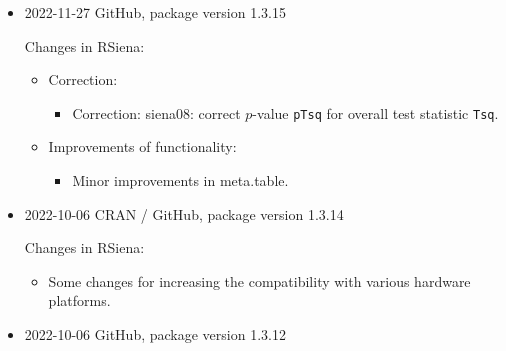 \documentclass[a4paper,fleqn,11pt]{article}
\newcommand{\+}{\, + \,}
\newcommand{\sfn}[1]{\textsf{#1}}
\begin{document}
\begin{small}
\begin{itemize}
\item 2022-11-27 GitHub, package version 1.3.15

Changes in RSiena:
\begin{itemize}
\item Correction:
    \begin{itemize}
    \item Correction: \textsf{siena08}: correct $p$-value \texttt{pTsq} for overall
        test statistic \texttt{Tsq}.
    \end{itemize}
\item Improvements of functionality:
    \begin{itemize}
    \item Minor improvements in  \sfn{meta.table}.
    \end{itemize}
\end{itemize}


\item 2022-10-06 CRAN / GitHub, package version 1.3.14

Changes in RSiena:
\begin{itemize}
\item Some changes for increasing the compatibility with various
      hardware platforms.
\end{itemize}

\item 2022-10-06 GitHub, package version 1.3.12


\end{itemize}
\end{small}
\end{document}

